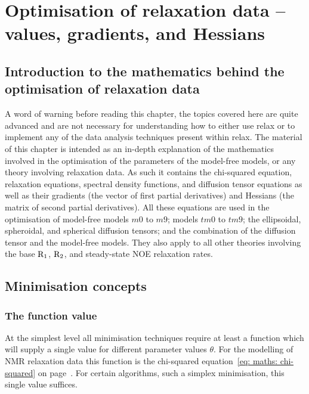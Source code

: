 
\chapter{Optimisation of relaxation data -- values, gradients, and Hessians} \label{ch: values, gradients, and Hessians}




\section{Introduction to the mathematics behind the optimisation of relaxation data}


A word of warning before reading this chapter, the topics covered here are quite advanced and are not necessary for understanding how to either use relax or to implement any of the data analysis techniques present within relax.  The material of this chapter is intended as an in-depth explanation of the mathematics involved in the optimisation of the parameters of the model-free models, or any theory involving relaxation data.  As such it contains the chi-squared equation, relaxation equations, spectral density functions, and diffusion tensor equations as well as their gradients (the vector of first partial derivatives) and Hessians (the matrix of second partial derivatives).  All these equations are used in the optimisation of model-free models $m0$ to $m9$; models $tm0$ to $tm9$; the ellipsoidal, spheroidal, and spherical diffusion tensors; and the combination of the diffusion tensor and the model-free models.  They also apply to all other theories involving the base $\mathrm{R}_1$, $\mathrm{R}_2$, and steady-state NOE relaxation rates.




\section{Minimisation concepts}

\subsection{The function value}

At the simplest level all minimisation techniques require at least a function which will supply a single value for different parameter values $\theta$.  For the modelling of NMR relaxation data this function is the chi-squared equation~\eqref{eq: maths: chi-squared} on page~\pageref{eq: maths: chi-squared}.  For certain algorithms, such a simplex minimisation, this single value suffices.



